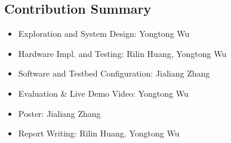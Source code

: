 \subsection{Contribution Summary}
\begin{itemize}
    \item Exploration and System Design: Yongtong Wu
    \item Hardware Impl. and Testing: Rilin Huang, Yongtong Wu
    \item Software and Testbed Configuration: Jialiang Zhang
    \item Evaluation \& Live Demo Video: Yongtong Wu
    \item Poster: Jialiang Zhang
    \item Report Writing: Rilin Huang, Yongtong Wu
\end{itemize}
